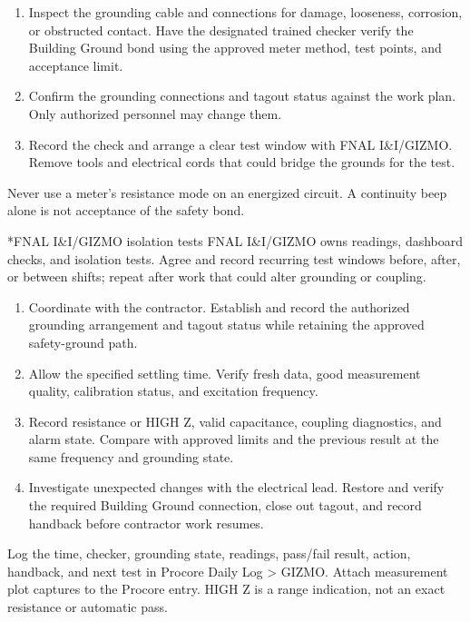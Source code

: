 \documentclass[10pt]{article}
\makeatletter
\renewcommand\section{\@startsection{section}{1}{\z@}{1.2ex plus .2ex}{.6ex}{\normalfont\large\bfseries}}
\makeatother
\begin{document}
\begin{enumerate}
\item Inspect the grounding cable and connections for damage, looseness, corrosion, or obstructed contact. Have the designated trained checker verify the Building Ground bond using the approved meter method, test points, and acceptance limit.
\item Confirm the grounding connections and tagout status against the work plan. Only authorized personnel may change them.
\item Record the check and arrange a clear test window with FNAL I\&I/GIZMO. Remove tools and electrical cords that could bridge the grounds for the test.
\end{enumerate}
Never use a meter's resistance mode on an energized circuit. A continuity beep alone is not acceptance of the safety bond.

\section*{FNAL I\&I/GIZMO isolation tests}
FNAL I\&I/GIZMO owns readings, dashboard checks, and isolation tests. Agree and record recurring test windows before, after, or between shifts; repeat after work that could alter grounding or coupling.

\begin{enumerate}
\item Coordinate with the contractor. Establish and record the authorized grounding arrangement and tagout status while retaining the approved safety-ground path.
\item Allow the specified settling time. Verify fresh data, good measurement quality, calibration status, and excitation frequency.
\item Record resistance or HIGH Z, valid capacitance, coupling diagnostics, and alarm state. Compare with approved limits and the previous result at the same frequency and grounding state.
\item Investigate unexpected changes with the electrical lead. Restore and verify the required Building Ground connection, close out tagout, and record handback before contractor work resumes.
\end{enumerate}
Log the time, checker, grounding state, readings, pass/fail result, action, handback, and next test in Procore Daily Log \textgreater{} GIZMO. Attach measurement plot captures to the Procore entry. HIGH Z is a range indication, not an exact resistance or automatic pass.
\end{document}
